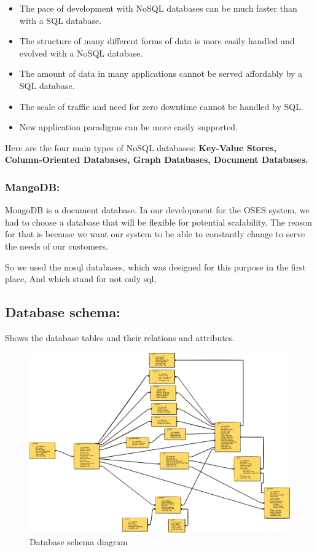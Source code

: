 \documentclass[]{uc2pfecaneva}
\begin{document}
    \begin{itemize}
        \item The pace of development with NoSQL databases can be much faster than with a SQL database.
        \item The structure of many different forms of data is more easily handled and evolved with a NoSQL database.
        \item The amount of data in many applications cannot be served affordably by a SQL database.
        \item The scale of traffic and need for zero downtime cannot be handled by SQL.
        \item New application paradigms can be more easily supported.
    \end{itemize}
    \linebreak
    Here are the four main types of NoSQL databases: \textbf{Key-Value Stores, Column-Oriented Databases, Graph Databases, Document Databases.}


    \subsubsection{MangoDB:}
    MongoDB is a document database. In our development for the OSES system, we had to choose a database that will be flexible for potential scalability. \linebreak
    The reason for that is because we want our system to be able to constantly change to serve the needs of our customers.

    So we used the nosql databases, which was designed for this purpose in the first place,
    And which stand for not only sql,
    \clearpage


    \subsection{Database schema:}
    \raggedright Shows the database tables and their relations and attributes.
    \begin{figure}[h]
        \includegraphics[width=\textwidth]{images/DbSchema}
        \caption{Database schema diagram}
    \end{figure}
\end{document}
